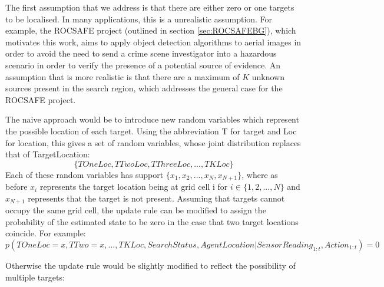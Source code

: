 The first assumption that we address is that there are either zero or one targets to be localised. In many applications, this is a unrealistic assumption. For example, the ROCSAFE project (outlined in section \ref{sec:ROCSAFEBG}), which motivates this work, aims to apply object detection algorithms to aerial images in order to avoid the need to send a crime scene investigator into a hazardous scenario in order to verify the presence of a potential source of evidence. An assumption that is more realistic is that there are a maximum of $K$ unknown sources present in the search region, which addresses the general case for the ROCSAFE  project.\par

The naive approach would be to introduce new random variables which represent the possible location of each target. Using the abbreviation T for target and Loc for location, this gives a set of random variables, whose joint distribution replaces that of TargetLocation: \[\{TOneLoc, TTwoLoc, TThreeLoc,...,TKLoc\}\] Each of these random variables has support $\{x_1, x_2, ..., x_N, x_{N+1}\}$, where as before $x_i$ represents the target location being at grid cell i for $i \in \{1,2, ..., N\}$ and $x_{N+1}$ represents that the target is not present. 
Assuming that targets cannot occupy the same grid cell, the update rule can be modified to assign the probability of the estimated state to be zero in the case that two target locations coincide. For example:
\footnotesize{
\[p(TOneLoc = x, TTwo = x, ..., TKLoc, SearchStatus, AgentLocation | SensorReading_{1:t}, Action_{1:t}) = 0\]}

\normalsize
Otherwise the update rule would be slightly modified to reflect the possibility of multiple targets: 


\scriptsize

